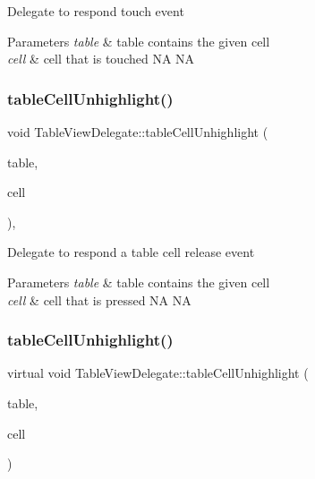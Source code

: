 Delegate to respond touch event


\begin{DoxyParams}{Parameters}
{\em table} & table contains the given cell \\
\hline
{\em cell} & cell that is touched  NA  NA \\
\hline
\end{DoxyParams}
\mbox{\label{classTableViewDelegate_a02338f00d3c1c2813bd18a561587dae6}} 
\subsubsection{\texorpdfstring{table\+Cell\+Unhighlight()}{tableCellUnhighlight()}\hspace{0.1cm}{\footnotesize\ttfamily [1/2]}}
{\footnotesize\ttfamily void Table\+View\+Delegate\+::table\+Cell\+Unhighlight (\begin{DoxyParamCaption}\item[{\hyperlink{classTableView}{Table\+View} $\ast$}]{table,  }\item[{\hyperlink{classTableViewCell}{Table\+View\+Cell} $\ast$}]{cell }\end{DoxyParamCaption})\hspace{0.3cm}{\ttfamily [inline]}, {\ttfamily [virtual]}}

Delegate to respond a table cell release event


\begin{DoxyParams}{Parameters}
{\em table} & table contains the given cell \\
\hline
{\em cell} & cell that is pressed  NA  NA \\
\hline
\end{DoxyParams}
\mbox{\label{classTableViewDelegate_a32936a13ec1c6156943f37ac05e10789}} 
\subsubsection{\texorpdfstring{table\+Cell\+Unhighlight()}{tableCellUnhighlight()}\hspace{0.1cm}{\footnotesize\ttfamily [2/2]}}
{\footnotesize\ttfamily virtual void Table\+View\+Delegate\+::table\+Cell\+Unhighlight (\begin{DoxyParamCaption}\item[{\hyperlink{classTableView}{Table\+View} $\ast$}]{table,  }\item[{\hyperlink{classTableViewCell}{Table\+View\+Cell} $\ast$}]{cell }\end{DoxyParamCaption})\hspace{0.3cm}{\ttfamily [virtual]}}

